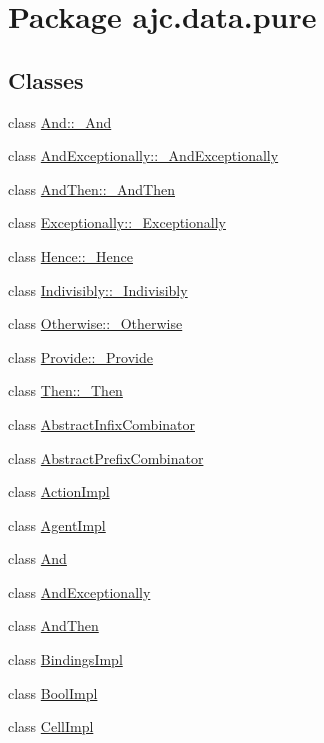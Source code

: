 \hypertarget{package__ajc_8data_8pure}{
\section{Package ajc.data.pure}
\label{package__ajc_8data_8pure}
}
\subsection*{Classes}
\begin{CompactItemize}
\item 
class \hyperlink{classAnd_1_1__And}{And::\_\-And}
\item 
class \hyperlink{classAndExceptionally_1_1__AndExceptionally}{And\-Exceptionally::\_\-And\-Exceptionally}
\item 
class \hyperlink{classAndThen_1_1__AndThen}{And\-Then::\_\-And\-Then}
\item 
class \hyperlink{classExceptionally_1_1__Exceptionally}{Exceptionally::\_\-Exceptionally}
\item 
class \hyperlink{classHence_1_1__Hence}{Hence::\_\-Hence}
\item 
class \hyperlink{classIndivisibly_1_1__Indivisibly}{Indivisibly::\_\-Indivisibly}
\item 
class \hyperlink{classOtherwise_1_1__Otherwise}{Otherwise::\_\-Otherwise}
\item 
class \hyperlink{classProvide_1_1__Provide}{Provide::\_\-Provide}
\item 
class \hyperlink{classThen_1_1__Then}{Then::\_\-Then}
\item 
class \hyperlink{classAbstractInfixCombinator}{Abstract\-Infix\-Combinator}
\item 
class \hyperlink{classAbstractPrefixCombinator}{Abstract\-Prefix\-Combinator}
\item 
class \hyperlink{classActionImpl}{Action\-Impl}
\item 
class \hyperlink{classAgentImpl}{Agent\-Impl}
\item 
class \hyperlink{classAnd}{And}
\item 
class \hyperlink{classAndExceptionally}{And\-Exceptionally}
\item 
class \hyperlink{classAndThen}{And\-Then}
\item 
class \hyperlink{classBindingsImpl}{Bindings\-Impl}
\item 
class \hyperlink{classBoolImpl}{Bool\-Impl}
\item 
class \hyperlink{classCellImpl}{Cell\-Impl}

\end{CompactItemize}

